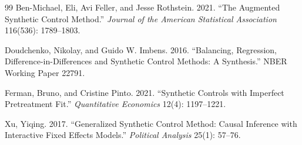 \documentclass[11pt]{article}
\theoremstyle{definition}
\theoremstyle{plain}
\theoremstyle{remark}
\begin{document}
\begin{thebibliography}{99}
Ben-Michael, Eli, Avi Feller, and Jesse Rothstein. 2021. ``The Augmented Synthetic Control Method.'' \emph{Journal of the American Statistical Association} 116(536): 1789--1803.

Doudchenko, Nikolay, and Guido W. Imbens. 2016. ``Balancing, Regression, Difference-in-Differences and Synthetic Control Methods: A Synthesis.'' NBER Working Paper 22791.

Ferman, Bruno, and Cristine Pinto. 2021. ``Synthetic Controls with Imperfect Pretreatment Fit.'' \emph{Quantitative Economics} 12(4): 1197--1221.

Xu, Yiqing. 2017. ``Generalized Synthetic Control Method: Causal Inference with Interactive Fixed Effects Models.'' \emph{Political Analysis} 25(1): 57--76.
\end{thebibliography}
\end{document}
